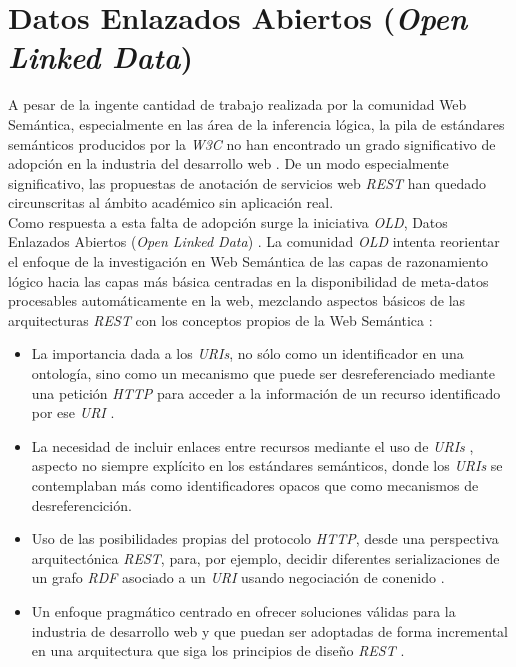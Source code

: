 \section{Datos Enlazados Abiertos (\textit{Open Linked Data})}

A pesar de la ingente cantidad de trabajo realizada por la comunidad Web Sem\'antica, especialmente en las \'area de la inferencia l\'ogica, la pila de est\'andares sem\'anticos producidos por la \textit{W3C} no han encontrado un grado significativo de adopci\'on en la industria del desarrollo web \cite{pedantic}. De un modo especialmente significativo, las propuestas de anotaci\'on de servicios web \textit{REST} han quedado circunscritas al \'ambito acad\'emico sin aplicaci\'on real.\\
Como respuesta a esta falta de adopci\'on surge la iniciativa \textit{OLD}, Datos Enlazados Abiertos (\textit{Open Linked Data}) \cite{old_story}. La comunidad \textit{OLD} intenta reorientar el enfoque de la investigaci\'on en Web Sem\'antica de las capas de razonamiento l\'ogico hacia las capas m\'as b\'asica centradas en la disponibilidad de meta-datos procesables autom\'aticamente en la web, mezclando aspectos b\'asicos de las arquitecturas \textit{REST} con los conceptos propios de la Web Sem\'antica \cite{page2011rest}:

\begin{itemize}

\item La importancia dada a los \textit{URIs}, no s\'olo como un identificador en una ontolog\'ia, sino como un mecanismo que puede ser desreferenciado mediante una petici\'on \textit{HTTP} para acceder a la informaci\'on de un recurso identificado por ese \textit{URI} \cite{sauermann2011cool}.

\item La necesidad de incluir enlaces entre recursos mediante el uso de \textit{URIs} \cite{hausenblas2009exploiting}, aspecto no siempre expl\'icito en los est\'andares sem\'anticos, donde los \textit{URIs} se contemplaban m\'as como identificadores opacos que como mecanismos de desreferencici\'on.

\item Uso de las posibilidades propias del protocolo \textit{HTTP}, desde una perspectiva arquitect\'onica \textit{REST}, para, por ejemplo, decidir diferentes serializaciones de un grafo \textit{RDF} asociado a un \textit{URI} usando negociaci\'on de conenido \cite{bizer2007publish}.

\item Un enfoque pragm\'atico centrado en ofrecer soluciones v\'alidas para la industria de desarrollo web y que puedan ser adoptadas de forma incremental en una arquitectura que siga los principios de dise\~no \textit{REST} \cite{heath2011linked}.

\end{itemize}

